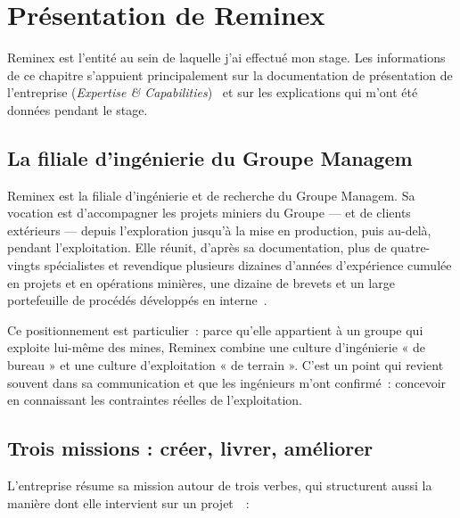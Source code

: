 \documentclass[12pt,a4paper,oneside]{report}
\begin{document}
\chapter{Présentation de Reminex}
\label{chap:reminex}

Reminex est l'entité au sein de laquelle j'ai effectué mon stage. Les informations de ce chapitre s'appuient principalement sur la documentation de présentation de l'entreprise (\textit{Expertise \& Capabilities})~\cite{reminex_capabilities} et sur les explications qui m'ont été données pendant le stage.

\section{La filiale d'ingénierie du Groupe Managem}

Reminex est la filiale d'ingénierie et de recherche du Groupe Managem. Sa vocation est d'accompagner les projets miniers du Groupe --- et de clients extérieurs --- depuis l'exploration jusqu'à la mise en production, puis au-delà, pendant l'exploitation. Elle réunit, d'après sa documentation, plus de quatre-vingts spécialistes et revendique plusieurs dizaines d'années d'expérience cumulée en projets et en opérations minières, une dizaine de brevets et un large portefeuille de procédés développés en interne~\cite{reminex_capabilities}.

Ce positionnement est particulier~: parce qu'elle appartient à un groupe qui exploite lui-même des mines, Reminex combine une culture d'ingénierie « de bureau » et une culture d'exploitation « de terrain ». C'est un point qui revient souvent dans sa communication et que les ingénieurs m'ont confirmé~: concevoir en connaissant les contraintes réelles de l'exploitation.

\section{Trois missions : créer, livrer, améliorer}

L'entreprise résume sa mission autour de trois verbes, qui structurent aussi la manière dont elle intervient sur un projet~\cite{reminex_capabilities}~:
\end{document}
